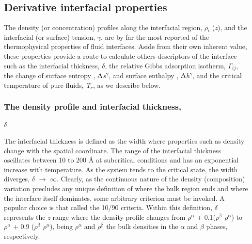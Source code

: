 \documentclass[9pt,bestpractices]{livecoms}
\begin{document}
\subsection{Derivative interfacial properties}

The density (or concentration) profiles along the interfacial region,
${\rho}$$_{i}$ (\textit{z}), and the interfacial (or surface) tension,
{${\gamma}$}, are by far the most reported of the thermophysical properties of
fluid interfaces. Aside from their own inherent value, these properties provide
a route to calculate others descriptors of the interface such as the
interfacial thickness, {${\delta}$}, the relative Gibbs adsorption isotherm,
${\Gamma}$$_{ij}$, the change of surface entropy
, ${\Updelta}$\textit{s}$^{{\gamma}}$, and surface enthalpy
, ${\Updelta}$\textit{h}$^{{\gamma}}$, and the critical temperature of pure
fluids, \textit{T}$_{c}$, as we describe below. 

\subsubsection{The density profile and interfacial thickness,} {${\delta}$}

The interfacial thickness is defined as the width where properties such as
density change with the spatial coordinate. The range of the interfacial
thickness oscillates between 10 to 200 \AA{} at subcritical conditions and has
an exponential increase with temperature. As the system tends to the critical
state, the width diverges, {${\delta}$} ${\rightarrow}$ ${\infty}$. Clearly, as
the continuous nature of the density (composition) variation precludes any
unique definition of where the bulk region ends and where the interface itself
dominates, some arbitrary criterion must be invoked. A popular choice is that
called the 10/90 criteria. Within this definition, {${\delta}$} represents the
\textit{z} range where the density profile changes from
${\rho}$$^{\mathrm{{\upalpha}}}$ + 0.1(${\rho}$$^{\mathrm{{\upbeta}}}$
\textendash{} ${\rho}$$^{\mathrm{{\upalpha}}}$) to
${\rho}$$^{\mathrm{{\upalpha}}}$ + 0.9 (${\rho}$$^{\mathrm{{\upbeta}}}$
\textendash{} ${\rho}$$^{\mathrm{{\upalpha}}}$), being
${\rho}$$^{\mathrm{{\upalpha}}}$ and ${\rho}$$^{\mathrm{{\upbeta}}}$ the bulk
densities in the {${\alpha}$} and {${\beta}$} phases, respectively.
\end{document}
